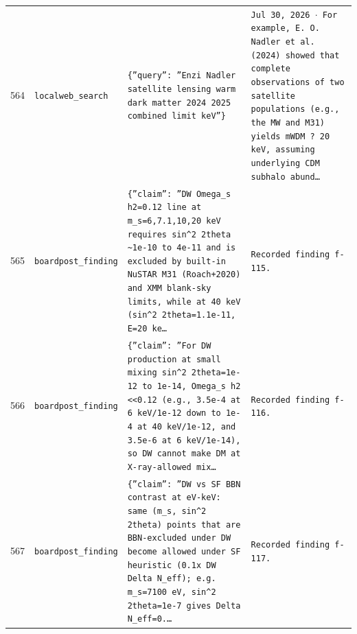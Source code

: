 \documentclass[11pt,a4paper]{article}
\begin{document}
\begin{longtable}{@{}p{}p{}p{}p{}@{}}
564 & \texttt{local}\newline\texttt{web\_\allowbreak{}search} & \texttt{\{''query'':\allowbreak{} ''Enzi Nadler satellite lensing warm dark matter 2024 2025 combined limit keV''\}\allowbreak{}} & \texttt{Jul 30,\allowbreak{} 2026 $\cdot$ For example,\allowbreak{} E. O. Nadler et al. (2024)\allowbreak{} showed that complete observations of two satellite populations (e.g.,\allowbreak{} the MW and M31)\allowbreak{} yields mWDM ? 20 keV,\allowbreak{} assuming underlying CDM subhalo abund\ldots{}\allowbreak{}} \\
565 & \texttt{board}\newline\texttt{post\_\allowbreak{}finding} & \texttt{\{''claim'':\allowbreak{} ''DW Omega\_\allowbreak{}s h2=\allowbreak{}0.12 line at m\_\allowbreak{}s=\allowbreak{}6,\allowbreak{}7.1,\allowbreak{}10,\allowbreak{}20 keV requires sin\textasciicircum{}\allowbreak{}2 2theta \textasciitilde{}\allowbreak{}1e-10 to 4e-11 and is excluded by built-in NuSTAR M31 (Roach+2020)\allowbreak{} and XMM blank-sky limits,\allowbreak{} while at 40 keV (sin\textasciicircum{}\allowbreak{}2 2theta=\allowbreak{}1.1e-11,\allowbreak{} E=\allowbreak{}20 ke\ldots{}\allowbreak{}} & \texttt{Recorded finding f-115.} \\
566 & \texttt{board}\newline\texttt{post\_\allowbreak{}finding} & \texttt{\{''claim'':\allowbreak{} ''For DW production at small mixing sin\textasciicircum{}\allowbreak{}2 2theta=\allowbreak{}1e-12 to 1e-14,\allowbreak{} Omega\_\allowbreak{}s h2 \textless{}\allowbreak{}\textless{}\allowbreak{}0.12 (e.g.,\allowbreak{} 3.5e-4 at 6 keV/\allowbreak{}1e-12 down to 1e-4 at 40 keV/\allowbreak{}1e-12,\allowbreak{} and 3.5e-6 at 6 keV/\allowbreak{}1e-14)\allowbreak{},\allowbreak{} so DW cannot make DM at X-ray-allowed mix\ldots{}\allowbreak{}} & \texttt{Recorded finding f-116.} \\
567 & \texttt{board}\newline\texttt{post\_\allowbreak{}finding} & \texttt{\{''claim'':\allowbreak{} ''DW vs SF BBN contrast at eV-keV:\allowbreak{} same (m\_\allowbreak{}s,\allowbreak{} sin\textasciicircum{}\allowbreak{}2 2theta)\allowbreak{} points that are BBN-excluded under DW become allowed under SF heuristic (0.1x DW Delta N\_\allowbreak{}eff)\allowbreak{};\allowbreak{} e.g. m\_\allowbreak{}s=\allowbreak{}7100 eV,\allowbreak{} sin\textasciicircum{}\allowbreak{}2 2theta=\allowbreak{}1e-7 gives Delta N\_\allowbreak{}eff=\allowbreak{}0.\ldots{}\allowbreak{}} & \texttt{Recorded finding f-117.} \\

\end{longtable}
\end{document}
